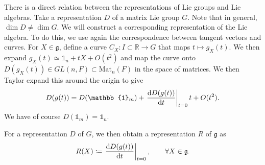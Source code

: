 There is a direct relation between the representations of Lie groups and Lie algebras.
Take a representation $D$ of a matrix Lie group $G$. Note that in general, $\dim D \neq \dim G$. We will construct a corresponding representation of the Lie algebra.
To do this, we use again the correspondence between tangent vectors and curves.
For $X \in \mathfrak{g}$, define a curve $C_X \colon I \subset \mathbb{R} \to G$ that maps $t \mapsto g_X(t)$. 
We then expand $g_X(t) \simeq \mathbb{1}_n + t X + O(t^2)$ and map the curve onto $D(g_X (t)) \in GL(n, F) \subset \text{Mat}_n(F)$ in the space of matrices.
  We then Taylor expand this around the origin to give
  \begin{equation}
    D(g(t)) = D(\mathbb{1}_m) + \left.\dv{D(g(t))}{t}\right\rvert_{t = 0} t + O(t^2).
  \end{equation}
  We have of course $D(\mathbb{1}_m) = \mathbb{1}_n$. 
\begin{claim}
  For a representation $D$ of $G$, we then obtain a representation $R$ of $\mathfrak{g}$ as
  \begin{equation}
    R(X) \coloneqq \left.\dv{D(g(t))}{t}\right\rvert_{t=0}, \qquad \forall X \in \mathfrak{g}.
  \end{equation}
\end{claim}



